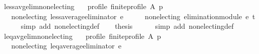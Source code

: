 \begin{isabellebody}
\isamarkupfalse%
%
\endisatagproof
{\isafoldproof}%
%
\isadelimproof
\isanewline
%
\endisadelimproof
\isanewline
{}\isamarkupfalse%
\ less{\isacharunderscore}{\kern0pt}avg{\isacharunderscore}{\kern0pt}elim{\isacharunderscore}{\kern0pt}non{\isacharunderscore}{\kern0pt}electing{\isacharcolon}{\kern0pt}\isanewline
\ \ \ profile{\isacharcolon}{\kern0pt}\ {\isachardoublequoteopen}finite{\isacharunderscore}{\kern0pt}profile\ A\ p{\isachardoublequoteclose}\isanewline
\ \ \ {\isachardoublequoteopen}non{\isacharunderscore}{\kern0pt}electing\ {\isacharparenleft}{\kern0pt}less{\isacharunderscore}{\kern0pt}average{\isacharunderscore}{\kern0pt}eliminator\ e{\isacharparenright}{\kern0pt}{\isachardoublequoteclose}\isanewline
%
\isadelimproof
%
\endisadelimproof
%
\isatagproof
{}\isamarkupfalse%
\ {\isacharminus}{\kern0pt}\isanewline
\ \ \isamarkupfalse%
\ {\isachardoublequoteopen}non{\isacharunderscore}{\kern0pt}electing\ {\isacharparenleft}{\kern0pt}elimination{\isacharunderscore}{\kern0pt}module\ e\ t\ {\isacharparenleft}{\kern0pt}{\isacharless}{\kern0pt}{\isacharparenright}{\kern0pt}{\isacharparenright}{\kern0pt}{\isachardoublequoteclose}\isanewline
\ \ \ \ \isamarkupfalse%
\ {\isacharparenleft}{\kern0pt}simp\ add{\isacharcolon}{\kern0pt}\ non{\isacharunderscore}{\kern0pt}electing{\isacharunderscore}{\kern0pt}def{\isacharparenright}{\kern0pt}\isanewline
\ \ \isamarkupfalse%
\ {\isacharquery}{\kern0pt}thesis\isanewline
\ \ \ \ \isamarkupfalse%
\ {\isacharparenleft}{\kern0pt}simp\ add{\isacharcolon}{\kern0pt}\ non{\isacharunderscore}{\kern0pt}electing{\isacharunderscore}{\kern0pt}def{\isacharparenright}{\kern0pt}\isanewline
{}\isamarkupfalse%
%
\endisatagproof
{\isafoldproof}%
%
\isadelimproof
\isanewline
%
\endisadelimproof
\isanewline
{}\isamarkupfalse%
\ leq{\isacharunderscore}{\kern0pt}avg{\isacharunderscore}{\kern0pt}elim{\isacharunderscore}{\kern0pt}non{\isacharunderscore}{\kern0pt}electing{\isacharcolon}{\kern0pt}\isanewline
\ \ \ profile{\isacharcolon}{\kern0pt}\ {\isachardoublequoteopen}finite{\isacharunderscore}{\kern0pt}profile\ A\ p{\isachardoublequoteclose}\isanewline
\ \ \ {\isachardoublequoteopen}non{\isacharunderscore}{\kern0pt}electing\ {\isacharparenleft}{\kern0pt}leq{\isacharunderscore}{\kern0pt}average{\isacharunderscore}{\kern0pt}eliminator\ e{\isacharparenright}{\kern0pt}{\isachardoublequoteclose}\isanewline
%
\isadelimproof
%
\endisadelimproof

\end{isabellebody}
